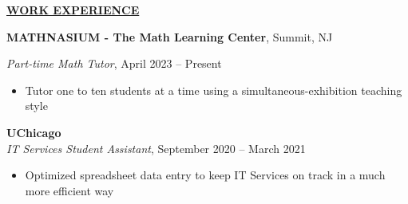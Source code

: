 \documentclass[
]{article}
\providecommand{\tightlist}{%
  \setlength{\itemsep}{0pt}\setlength{\parskip}{0pt}}
\begin{document}

\textbf{\underline{WORK EXPERIENCE}}








\textbf{MATHNASIUM - The Math Learning Center}, Summit, NJ

\emph{Part-time Math Tutor}, April 2023 -- Present

\begin{itemize}
\tightlist
\item
    Tutor one to ten students at a time using a simultaneous-exhibition teaching style
\end{itemize}



\textbf{UChicago}\\
\emph{IT Services Student Assistant}, September %
2020 -- March %
2021

\begin{itemize}
\tightlist
\item
  Optimized spreadsheet data entry to keep IT Services on track in a
  much more efficient way
\end{itemize}
\end{document}
